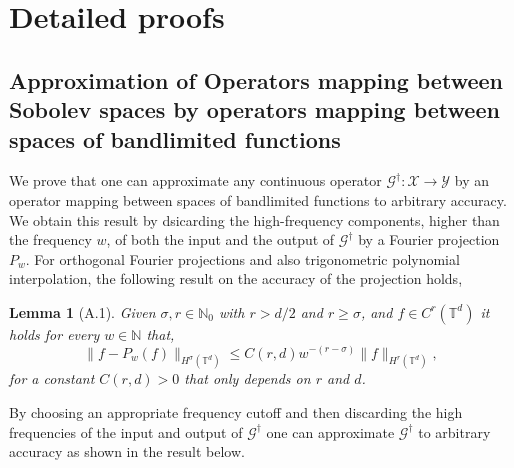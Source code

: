 \documentclass[reqno,10pt]{amsart}
\theoremstyle{plain}
\newtheorem*{lem*}{Lemma}
\theoremstyle{definition}
\newcommand{\bb}[1]{\mathbb{#1}}
\newcommand{\cal}[1]{\mathcal{#1}}
\begin{document}
    \appendix
    \section{\bf Detailed proofs}
    \subsection[A.1]{Approximation of Operators mapping between Sobolev spaces by operators mapping between spaces of bandlimited functions} \label{appendix:A.1}
    We prove that one can approximate any continuous operator $\cal G^\dag : \cal X \to \cal Y$ by an operator mapping between spaces of bandlimited functions to arbitrary accuracy. We obtain this result by dsicarding the high-frequency components, higher than the frequency $w$, of both the input and the output of $\cal G^\dag$ by a Fourier projection $P_w$. For orthogonal Fourier projections and also trigonometric polynomial interpolation, the following result on the accuracy of the projection holds,

    \begin{lem*}[A.1] \label{lemA1}
        Given $\sigma, r \in \bb N_0$ with $r > d/2$ and $r \geq \sigma$, and $f \in C^r(\bb T^d)$ it holds for every $w \in \bb N$ that, 
        \begin{equation}
            \|f - P_w(f)\|_{H^\sigma(\bb T^d)} \leq C(r,d)w^{-(r-\sigma)}\|f\|_{H^r(\bb T^d)},
        \end{equation}
        for a constant $C(r,d) > 0$ that only depends on $r$ and $d$.
    \end{lem*}
    By choosing an appropriate frequency cutoff and then discarding the high frequencies of the input and output of $\cal G^\dag$ one can approximate $\cal G^\dag$ to arbitrary accuracy as shown in the result below.
    
\end{document}
